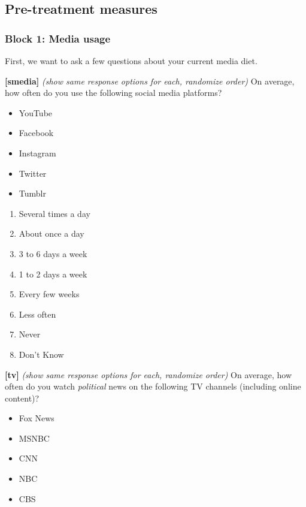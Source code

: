 \documentclass[]{article}
\providecommand{\tightlist}{%
  \setlength{\itemsep}{0pt}\setlength{\parskip}{0pt}}
\begin{document}
\hypertarget{pre-treatment-measures}{%
\subsection{Pre-treatment measures}\label{pre-treatment-measures}}

\hypertarget{block-1-media-usage}{%
\subsubsection{Block 1: Media usage}\label{block-1-media-usage}}

First, we want to ask a few questions about your current media diet.

\textbf{{[}smedia{]}} \emph{(show same response options for each,
randomize order)} On average, how often do you use the following social
media platforms?

\begin{itemize}
\tightlist
\item
  YouTube
\item
  Facebook
\item
  Instagram
\item
  Twitter
\item
  Tumblr
\end{itemize}

\begin{enumerate}
\def\labelenumi{\arabic{enumi}.}
\tightlist
\item
  Several times a day
\item
  About once a day
\item
  3 to 6 days a week
\item
  1 to 2 days a week
\item
  Every few weeks
\item
  Less often
\item
  Never
\item
  Don't Know
\end{enumerate}

\textbf{{[}tv{]}} \emph{(show same response options for each, randomize
order)} On average, how often do you watch \emph{political} news on the
following TV channels (including online content)?

\begin{itemize}
\tightlist
\item
  Fox News
\item
  MSNBC
\item
  CNN
\item
  NBC
\item
  CBS
\end{itemize}
\end{document}
